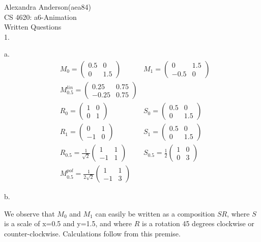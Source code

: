 \documentclass{letter}
\begin{document}
Alexandra Anderson(aea84) \\
CS 4620: a6-Animation \\
Written Questions \\

1. 

a. 
\begin{align*}
& M_0 = 
\begin{pmatrix}
0.5 & 0 \\
0 & 1.5
\end{pmatrix}
\quad \quad 
& M_1 = 
\begin{pmatrix} 
0 & 1.5 \\ 
-0.5 & 0
\end{pmatrix} \\
& M_{0.5}^{lin} = 
\begin{pmatrix}
0.25 & 0.75 \\
-0.25 & 0.75
\end{pmatrix} \\
& R_0 = 
\begin{pmatrix}
1 & 0 \\
0 & 1
\end{pmatrix}
\quad \quad 
& S_0 = 
\begin{pmatrix}
0.5 & 0 \\
0 & 1.5
\end{pmatrix} \\
& R_1 = 
\begin{pmatrix}
0 & 1 \\
-1 & 0
\end{pmatrix}
\quad \quad 
& S_1 = 
\begin{pmatrix}
0.5 & 0 \\
0 & 1.5
\end{pmatrix} \\
& R_{0.5} = 
\frac{1}{\sqrt{2}}
\begin{pmatrix}
1 & 1 \\
-1 & 1
\end{pmatrix}
& S_{0.5} = 
\frac{1}{2}
\begin{pmatrix}
1 & 0 \\
0 & 3
\end{pmatrix} \\
& M_{0.5}^{pol} =
\frac{1}{2\sqrt{2}}
\begin{pmatrix}
1 & 1 \\
-1 & 3
\end{pmatrix} 
\end{align*}

b. 

We observe that $M_0$ and $M_1$ can easily be written as a composition $SR$, where $S$ is a scale of x=0.5 and y=1.5, and where $R$ is a rotation 45 degrees clockwise or counter-clockwise. Calculations follow from this premise. 
\end{document}
